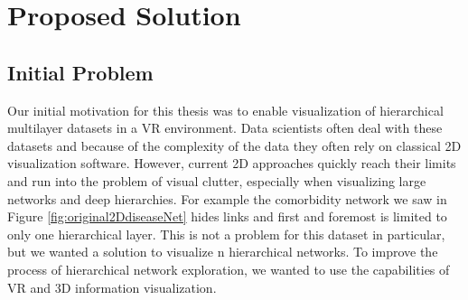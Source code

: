 \chapter{Proposed Solution}
\label{chap:proposed-Solution}
\section{Initial Problem}

Our initial motivation for this thesis was to enable visualization of hierarchical multilayer datasets in a VR environment. 
Data scientists often deal with these datasets and because of the complexity of the data they often rely on classical 2D visualization software.
However, current 2D approaches quickly reach their limits and run into the problem of visual clutter, especially when visualizing large networks and deep hierarchies. For example the comorbidity network we saw in Figure \ref{fig:original2DdiseaseNet} hides links and first and foremost is limited to only one hierarchical layer. This is not a problem for this dataset in particular, but we wanted a solution to visualize n hierarchical networks.
To improve the process of hierarchical network exploration, we wanted to use the capabilities of VR and 3D information visualization. 

